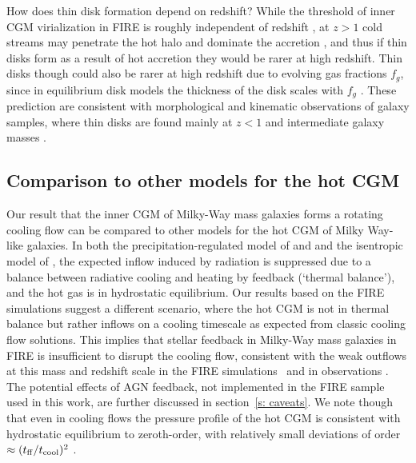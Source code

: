 \documentclass[fleqn,usenatbib]{mnras}
\begin{document}
How does thin disk formation depend on redshift?
While the threshold of inner CGM virialization in FIRE is roughly independent of redshift \citep{Stern2021,Stern2021a}, at $z>1$
cold streams may penetrate the hot halo and dominate the accretion \cite[e.g.,][]{Keres2005,Dekel2006, Dekel2009}, and thus if thin disks form as a result of hot accretion they would be rarer at high redshift.
Thin disks though could also be rarer at high redshift due to evolving gas fractions $f_g$, since in equilibrium disk models the thickness of the disk scales with $f_g$ \citep{Thompson2005, Faucher-Giguere2013, Krumholz2018}.
These prediction are consistent with morphological and kinematic observations of galaxy samples, where thin disks are found mainly at $z<1$ and intermediate galaxy masses \citep[e.g.,][]{Kassin2012, vanderWel14}. 

\subsection{Comparison to other models for the hot CGM}

Our result that the inner CGM of Milky-Way mass galaxies forms a rotating cooling flow can be compared to other models for the hot CGM of Milky Way-like galaxies.
In both the precipitation-regulated model of \cite{Sharma2012} and \cite{Voit2017} and the isentropic model of \cite{Faerman2020}, the expected inflow induced by radiation is suppressed due to a balance between radiative cooling and heating by feedback (`thermal balance'), and the hot gas is in hydrostatic equilibrium.
Our results based on the FIRE simulations suggest a different scenario, where the hot CGM is not in thermal balance but rather inflows on a cooling timescale as expected from classic cooling flow solutions.
This implies that stellar feedback in Milky-Way mass galaxies in FIRE is insufficient to disrupt the cooling flow, consistent with the weak outflows at this mass and redshift scale in the FIRE simulations~\citep{Muratov2015, Muratov2017, Angles-Alcazar2017, Pandya2021} and in observations \citep[e.g.,][]{Heckman2019}.
The potential effects of AGN feedback, not implemented in the FIRE sample used in this work, are further discussed in section~\ref{s: caveats}.
We note though that even in cooling flows the pressure profile of the hot CGM is consistent with hydrostatic equilibrium to zeroth-order, with relatively small deviations of order $\approx(t_{\rm ff}/t_{\rm cool})^2$ \citep{Stern2019}. 
\end{document}
